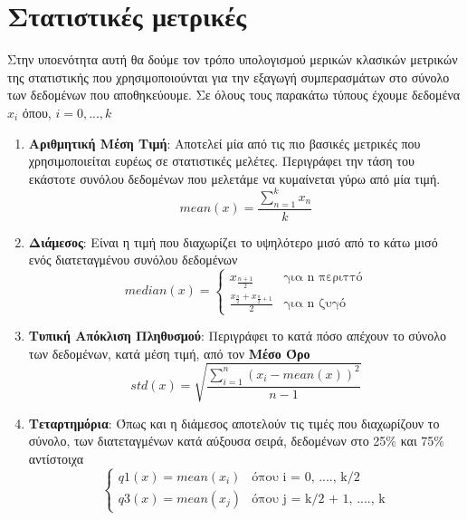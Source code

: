 \break

\section{Στατιστικές μετρικές}
\label{section:statistics}

Στην υποενότητα αυτή θα δούμε τον τρόπο υπολογισμού μερικών κλασικών μετρικών της στατιστικής
που χρησιμοποιούνται για την εξαγωγή συμπερασμάτων στο σύνολο των δεδομένων που αποθηκεύουμε.
Σε όλους τους παρακάτω τύπους έχουμε δεδομένα $x_i$ όπου, $i = 0, ..., k$

\begin{enumerate}
	\item \textbf{Αριθμητική Μέση Τιμή}: Αποτελεί μία από τις πιο βασικές μετρικές που χρησιμοποιείται ευρέως σε στατιστικές μελέτες.
		Περιγράφει την τάση του εκάστοτε συνόλου δεδομένων που μελετάμε να κυμαίνεται γύρω από μία τιμή.
	      \begin{equation}
		      mean(x) = \frac{\sum_{n = 1}^{k} x_n}{k}
	      \end{equation}
	\item \textbf{Διάμεσος}: Είναι η τιμή που διαχωρίζει το υψηλότερο μισό από το κάτω μισό ενός διατεταγμένου συνόλου δεδομένων 
	      \begin{equation}
		      median(x) =
		      \begin{cases}
			      x_{\frac{n + 1}{2}}                             & \text{για n περιττό}
			      \\[10pt]
			      \frac{x_{\frac{n}{2}} + x_{\frac{n}{2} + 1}}{2} & \text{για n ζυγό}
		      \end{cases}
	      \end{equation}
	\item \textbf{Τυπική Απόκλιση Πληθυσμού}: Περιγράφει το κατά πόσο απέχουν το σύνολο των δεδομένων, κατά μέση τιμή, από τον \textbf{Μέσο Όρο}
	      \begin{equation}
		      std(x) = \sqrt{\frac{\sum_{i = 1}^{n} (x_i - mean(x))^2}{n - 1}}
	      \end{equation}
	\item \textbf{Τεταρτημόρια}: Όπως και η διάμεσος αποτελούν τις τιμές που διαχωρίζουν το σύνολο, των
		  διατεταγμένων κατά αύξουσα σειρά, δεδομένων στο 25\% και 75\% αντίστοιχα  
	      \begin{equation}
				\begin{cases}
					q1(x) = mean(x_i) & \text{όπου i = 0, ...., k/2} \\
					q3(x) = mean(x_j) & \text{όπου j = k/2 + 1, ...., k}
				\end{cases}
	      \end{equation}
\end{enumerate}

\break